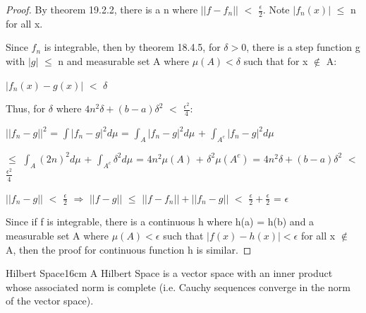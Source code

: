     \begin{proof}
        By {\color{red} theorem 19.2.2}, there is a n where
        $||f-f_n||$ $<$ $\frac{\epsilon}{2}$.
        Note $|f_n(x)|$ $\leq$ n for all x.

        Since $f_n$ is integrable, then by {\color{red} theorem 18.4.5},
        for $\delta > 0$, there is a step function g with $|g|$ $\leq$ n
        and measurable set A where $\mu(A) < \delta$ such that for x $\not \in$ A:

        \hspace{0.5cm}
        $|f_n(x) - g(x)|$ $<$ $\delta$

        Thus, for $\delta$ where
        $4n^2\delta +(b-a)\delta^2$ $<$ $\frac{\epsilon^2}{4}$:

        \hspace{0.5cm}
        $||f_n - g||^2$
        = $\int |f_n - g|^2 d\mu$
        = $\int_A |f_n - g|^2 d\mu$ + $\int_{A^c} |f_n - g|^2 d\mu$

        \hspace{2.4cm}
        $\leq$ $\int_A (2n)^2 d\mu$ + $\int_{A^c} \delta^2 d\mu$
        = $4n^2 \mu(A)$ + $\delta^2 \mu(A^c)$
        = $4n^2 \delta + (b-a)\delta^2$
        $<$ $\frac{\epsilon^2}{4}$

        \hspace{0.5cm}
        $||f_n - g||$ $<$ $\frac{\epsilon}{2}$
        \hspace{0.5cm}
        $\Rightarrow$
        \hspace{0.5cm}
        $||f-g||$
        $\leq$ $||f-f_n|| + ||f_n-g||$
        $<$ $\frac{\epsilon}{2} + \frac{\epsilon}{2}$
        = $\epsilon$

        Since if f is integrable, there is a continuous h where h(a) = h(b)
        and a measurable set A where $\mu(A) < \epsilon$
        such that $|f(x)-h(x)| < \epsilon$ for all x $\not \in$ A,
        then the proof for continuous function h is similar.
    \end{proof}

    \vspace{0.5cm}



    \begin{definition}{Hilbert Space}{16cm}
        A {\color{lblue} Hilbert Space}
        is a vector space with an inner product whose associated norm
        is complete
        (i.e. Cauchy sequences converge in the norm of the vector space).
    \end{definition}

